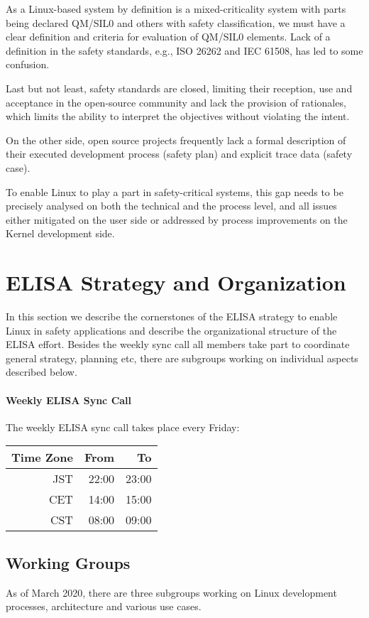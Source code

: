 \documentclass[12pt]{ElisaPaper}
\begin{document}
As a Linux-based system by definition is a mixed-criticality system with parts being declared QM/SIL0 and others with safety classification, we must have a clear definition and criteria for evaluation of QM/SIL0 elements.
Lack of a definition in the safety standards, e.g., ISO 26262 and IEC 61508, has led to some confusion.

Last but not least, safety standards are closed, limiting their reception, use and acceptance in the open-source community and lack the provision of rationales, which limits the ability to interpret the objectives without violating the intent.

On the other side, open source projects frequently lack a formal description of their executed development process (safety plan) and explicit trace data (safety case).

To enable Linux to play a part in safety-critical systems, this gap needs to be precisely analysed on both the technical and the process level, and all issues either mitigated on the user side or addressed by process improvements on the Kernel development side.

\section{ELISA Strategy and Organization}
In this section we describe the cornerstones of the ELISA strategy to enable Linux in safety applications and describe the organizational structure of the ELISA effort.
Besides the weekly sync call all members take part to coordinate general strategy, planning etc, there are subgroups working on individual aspects described below.
\paragraph{Weekly ELISA Sync Call}
The weekly ELISA sync call takes place every Friday:
\begin{center}
	\begin{tabular}{rrr}
		\toprule
		Time Zone & From & To\\
		\midrule
		JST & 22:00 & 23:00 \\
		CET	& 14:00 & 15:00 \\
		CST & 08:00 & 09:00 \\
		\bottomrule
	\end{tabular} 
\end{center}
\subsection{Working Groups}
As of March 2020, there are three subgroups working on Linux development processes, architecture and various use cases.
\end{document}
